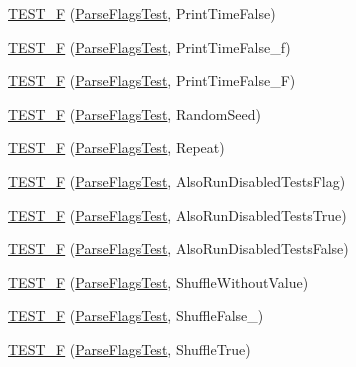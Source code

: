 \begin{DoxyCompactItemize}
\item 
\mbox{\hyperlink{namespacetesting_aae74ae96560ea57a139eb6c8f502aa35}{T\+E\+S\+T\+\_\+F}} (\mbox{\hyperlink{classtesting_1_1_parse_flags_test}{Parse\+Flags\+Test}}, Print\+Time\+False)
\item 
\mbox{\hyperlink{namespacetesting_a4d0ef8499ed9a23e0e4b6d8ae66a61c8}{T\+E\+S\+T\+\_\+F}} (\mbox{\hyperlink{classtesting_1_1_parse_flags_test}{Parse\+Flags\+Test}}, Print\+Time\+False\+\_\+f)
\item 
\mbox{\hyperlink{namespacetesting_a776cc6047fe6c96564bea11143aebc3e}{T\+E\+S\+T\+\_\+F}} (\mbox{\hyperlink{classtesting_1_1_parse_flags_test}{Parse\+Flags\+Test}}, Print\+Time\+False\+\_\+F)
\item 
\mbox{\hyperlink{namespacetesting_a8c91f18e468506e7d64fa57fdec303c4}{T\+E\+S\+T\+\_\+F}} (\mbox{\hyperlink{classtesting_1_1_parse_flags_test}{Parse\+Flags\+Test}}, Random\+Seed)
\item 
\mbox{\hyperlink{namespacetesting_aad196be6244a5fd202ea05c8c409b0d1}{T\+E\+S\+T\+\_\+F}} (\mbox{\hyperlink{classtesting_1_1_parse_flags_test}{Parse\+Flags\+Test}}, Repeat)
\item 
\mbox{\hyperlink{namespacetesting_a579ed858a912b7fd5ff7b68f3c0d9184}{T\+E\+S\+T\+\_\+F}} (\mbox{\hyperlink{classtesting_1_1_parse_flags_test}{Parse\+Flags\+Test}}, Also\+Run\+Disabled\+Tests\+Flag)
\item 
\mbox{\hyperlink{namespacetesting_accb8f0a859dab6088b9429bf6fb3e1ac}{T\+E\+S\+T\+\_\+F}} (\mbox{\hyperlink{classtesting_1_1_parse_flags_test}{Parse\+Flags\+Test}}, Also\+Run\+Disabled\+Tests\+True)
\item 
\mbox{\hyperlink{namespacetesting_afde27ba975e4a485af64de4c37dcbb98}{T\+E\+S\+T\+\_\+F}} (\mbox{\hyperlink{classtesting_1_1_parse_flags_test}{Parse\+Flags\+Test}}, Also\+Run\+Disabled\+Tests\+False)
\item 
\mbox{\hyperlink{namespacetesting_a23373676b5605f4446444568b03851c1}{T\+E\+S\+T\+\_\+F}} (\mbox{\hyperlink{classtesting_1_1_parse_flags_test}{Parse\+Flags\+Test}}, Shuffle\+Without\+Value)
\item 
\mbox{\hyperlink{namespacetesting_ac510159c0bac8ecf77e0d3884569b314}{T\+E\+S\+T\+\_\+F}} (\mbox{\hyperlink{classtesting_1_1_parse_flags_test}{Parse\+Flags\+Test}}, Shuffle\+False\+\_)
\item 
\mbox{\hyperlink{namespacetesting_a11ba77d82075e6b72cc2cc3a0568eb4b}{T\+E\+S\+T\+\_\+F}} (\mbox{\hyperlink{classtesting_1_1_parse_flags_test}{Parse\+Flags\+Test}}, Shuffle\+True)
\item 

\end{DoxyCompactItemize}
